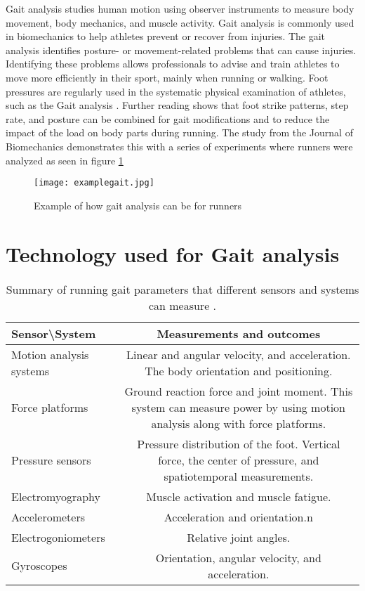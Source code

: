 Gait analysis studies human motion using observer instruments to measure body movement, body mechanics, and muscle activity. Gait analysis is commonly used in biomechanics to help athletes prevent or recover from injuries. The gait analysis identifies posture- or movement-related problems that can cause injuries. Identifying these problems allows professionals to advise and train athletes to move more efficiently in their sport, mainly when running or walking. Foot pressures are regularly used in the systematic physical examination of athletes, such as the Gait analysis \cite{Baker2006}. Further reading shows that foot strike patterns, step rate, and posture can be combined for gait modifications and to reduce the impact of the load on body parts during running. The study \cite{HUANG2019102} from the Journal of Biomechanics demonstrates this with a series of experiments where runners were analyzed as seen in figure \ref{fig:examplegait}  

\begin{figure}[!htb]
    \centering
    \texttt{[image: examplegait.jpg]}
    \caption{Example of how gait analysis can be for runners}
    \label{fig:examplegait}
\end{figure}


\newpage
\section{Technology used for Gait analysis}
\label{technologygair}

\begin{table}[!h]
    \mytable
    \caption{Summary of running gait parameters that different sensors and systems can measure  \cite{higginsonbrian2009}.}
    \begin{tabularx}{\linewidth}{@{}lC@{}}
        \toprule
        Sensor\textbackslash System     & Measurements and outcomes \\
        \midrule
        Motion analysis systems                       & Linear and angular velocity, and acceleration. The body orientation and positioning.\\
        Force platforms    & Ground reaction force and joint moment. This system can measure power by using motion analysis along with force platforms. \\
        Pressure sensors        & Pressure distribution of the foot. Vertical force, the center of pressure, and spatiotemporal measurements. \\
        Electromyography  & Muscle activation and muscle fatigue.\\
        Accelerometers  & Acceleration and orientation.n\\
        Electrogoniometers  & Relative joint angles.\\
        Gyroscopes  & Orientation, angular velocity, and acceleration.\\
        \bottomrule
    \end{tabularx}
    \label{tbl:exemplars}
\end{table}
\clearpage
